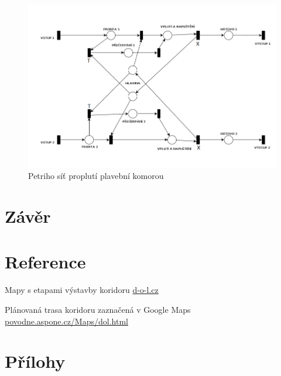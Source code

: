 \documentclass[11pt,a4paper]{article}
\begin{document}
      \begin{figure}[ht!]
        \centering
        \includegraphics[width=1\textwidth, natwidth=940, natheight=325]
                        {petri_net_2.png}
        \caption{Petriho síť proplutí plavební komorou \label{petri_2}}
      \end{figure}

  \section{Závěr}

  \section{Reference}

    \begin{enumerate}[label={[\arabic*]}]
      \item Mapy s etapami výstavby koridoru 
        \href{http://d-o-l.cz/index.php/cs/kestazeni/category/14}
             {d-o-l.cz}
      \item Plánovaná trasa koridoru zaznačená v Google Maps
        \href{http://povode.aspone.cz/Maps/dol.html}
             {povodne.aspone.cz/Maps/dol.html}
    \end{enumerate}

  \appendix
    \newpage

  \section{Přílohy}
\end{document}
